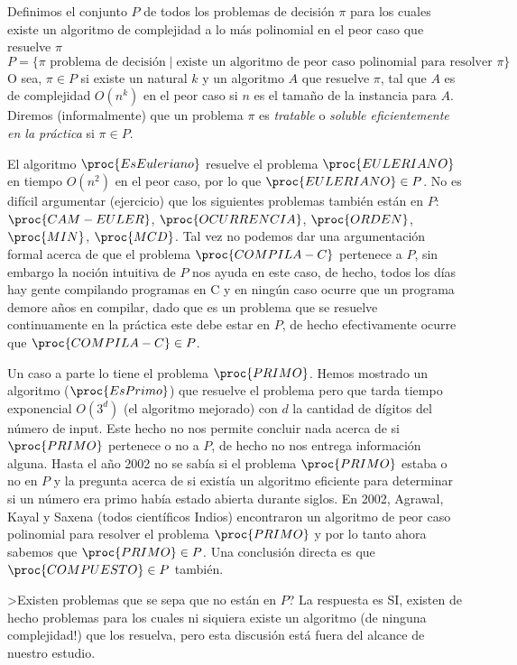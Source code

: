\begin{definicion}
Definimos el conjunto $P$ de todos los problemas de decisión $\pi$ para los cuales existe un algoritmo de complejidad a lo más polinomial en el peor caso que resuelve $\pi$
\[
P=\{\pi\text{ problema de decisión}\;|\;\text{existe un algoritmo de peor caso polinomial para resolver }\pi\}
\]
O sea, $\pi\in P$ si existe un natural $k$ y un algoritmo $A$ que resuelve $\pi$, tal que $A$ es de complejidad $O(n^k)$ en el peor caso si $n$ es el tamaño de la instancia para $A$.
Diremos (informalmente) que un problema $\pi$ es \emph{tratable} o \emph{soluble eficientemente en la práctica} si $\pi\in P$.
\end{definicion}


El algoritmo $\proc{EsEuleriano}$ resuelve el problema $\proc{EULERIANO}$ en tiempo $O(n^2)$ en el peor caso, por lo que $\proc{EULERIANO}\in P$.
No es difícil argumentar (ejercicio) que los siguientes problemas también están en $P$: $\proc{CAM-EULER}$, $\proc{OCURRENCIA}$, $\proc{ORDEN}$, $\proc{MIN}$, $\proc{MCD}$.
Tal vez no podemos dar una argumentación formal acerca de que el problema $\proc{COMPILA-C}$ pertenece a $P$, sin embargo la noción intuitiva de $P$ nos ayuda en este caso, de hecho, 
todos los días hay gente compilando programas en C y en ningún caso ocurre que un programa demore años en compilar, dado que es un problema que se resuelve continuamente en la práctica este debe estar en $P$, de hecho efectivamente ocurre que $\proc{COMPILA-C}\in P$.

Un caso a parte lo tiene el problema $\proc{PRIMO}$.
Hemos mostrado un algoritmo ($\proc{EsPrimo}$) que resuelve el problema pero que tarda tiempo exponencial $O(3^d)$ (el algoritmo mejorado) con $d$ la cantidad de dígitos del número de input.
Este hecho no nos permite concluir nada acerca de si $\proc{PRIMO}$ pertenece o no a $P$, de hecho no nos entrega información alguna.
Hasta el año 2002 no se sabía si el problema $\proc{PRIMO}$ estaba o no en $P$ y la pregunta acerca de si existía un algoritmo eficiente para determinar si un número era primo había estado abierta durante siglos.
En 2002, Agrawal, Kayal y Saxena (todos científicos Indios) encontraron un algoritmo de peor caso polinomial para resolver el problema $\proc{PRIMO}$ y por lo tanto ahora sabemos que $\proc{PRIMO}\in P$.
Una conclusión directa es que $\proc{COMPUESTO}\in P$ también.

>Existen problemas que se sepa que no están en $P$?
La respuesta es SI, existen de hecho problemas para los cuales ni siquiera existe un algoritmo (de ninguna complejidad!) que los resuelva, pero esta discusión está fuera del alcance de nuestro estudio.

